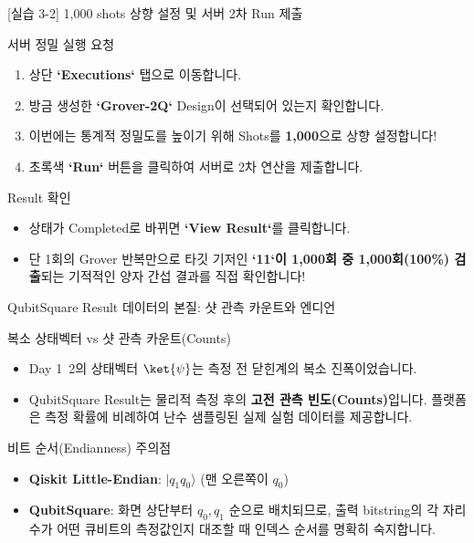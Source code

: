 \documentclass[aspectratio=169, 10pt]{beamer}
\begin{document}
\begin{frame}{[실습 3-2] 1,000 shots 상향 설정 및 서버 2차 Run 제출}
    \begin{qcblock}{서버 정밀 실행 요청}
        \begin{enumerate}
            \item 상단 \textbf{`Executions`} 탭으로 이동합니다.
            \pause
            \item 방금 생성한 \textbf{`Grover-2Q`} Design이 선택되어 있는지 확인합니다.
            \pause
            \item 이번에는 통계적 정밀도를 높이기 위해 Shots를 \textbf{1,000}으로 상향 설정합니다!
            \pause
            \item 초록색 \textbf{`Run`} 버튼을 클릭하여 서버로 2차 연산을 제출합니다.
        \end{enumerate}
    \end{qcblock}
    \vspace{0.2cm}
    \begin{qctip}{Result 확인}
        \begin{itemize}
            \item 상태가 Completed로 바뀌면 \textbf{`View Result`}를 클릭합니다.
            \pause
            \item 단 1회의 Grover 반복만으로 타깃 기저인 \textbf{`11`이 1,000회 중 1,000회(100\%) 검출}되는 기적적인 양자 간섭 결과를 직접 확인합니다!
        \end{itemize}
    \end{qctip}
\end{frame}

\begin{frame}{QubitSquare Result 데이터의 본질: 샷 관측 카운트와 엔디언}
    \begin{qcblock}{복소 상태벡터 vs 샷 관측 카운트(Counts)}
        \begin{itemize}
            \item Day 1~2의 상태벡터 $\ket{\psi}$는 측정 전 닫힌계의 복소 진폭이었습니다.
            \pause
            \item QubitSquare Result는 물리적 측정 후의 \textbf{고전 관측 빈도(Counts)}입니다. 플랫폼은 측정 확률에 비례하여 난수 샘플링된 실제 실험 데이터를 제공합니다.
        \end{itemize}
    \end{qcblock}
    \vspace{0.2cm}
    \begin{qctip}{비트 순서(Endianness) 주의점}
        \begin{itemize}
            \item \textbf{Qiskit Little-Endian}: $|q_1 q_0\rangle$ (맨 오른쪽이 $q_0$)
            \pause
            \item \textbf{QubitSquare}: 화면 상단부터 $q_0, q_1$ 순으로 배치되므로, 출력 bitstring의 각 자리수가 어떤 큐비트의 측정값인지 대조할 때 인덱스 순서를 명확히 숙지합니다.
        \end{itemize}
    \end{qctip}
\end{frame}
\end{document}
